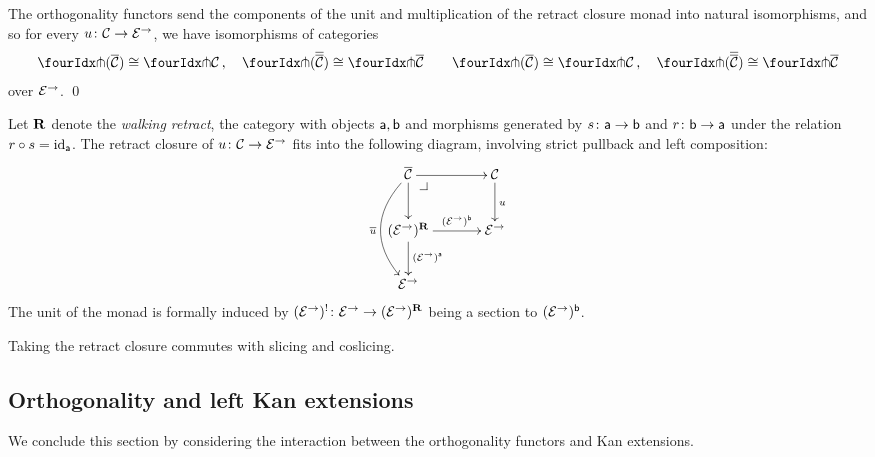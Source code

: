 \documentclass[reqno,10pt,a4paper,oneside]{amsart}
\begin{document}
\begin{proposition}
\label{retract-closure}
The orthogonality functors send the components of the unit and multiplication of the retract closure monad into natural
isomorphisms, and so for every $u \colon \mathcal{C} \to \mathcal{E}^\to$, we have isomorphisms of categories
\begin{gather*} 
 \liftr{(\overline{\cal{C}})} \iso \liftr{\cal{C}} \, , \quad
 \liftr{(\overline{\overline{\cal{C}}})} \iso \liftr{\overline{\cal{C}}}  \qquad
 \liftl{(\overline{\cal{C}})} \iso \liftl{\cal{C}} \, , \quad
 \liftl{(\overline{\overline{\cal{C}}})} \iso \liftl{\overline{\cal{C}}}
\end{gather*} 
over $\mathcal{E}^\to$. \qed
\end{proposition}




\begin{remark} Let $\mathbf{R}$ denote the \emph{walking retract}, \ie the category with objects $\mathsf{a}, \mathsf{b}$ and morphisms generated by $s \colon \mathsf{a} \to \mathsf{b}$ and $r \colon \mathsf{b} \to \mathsf{a}$ under the relation $r \mathbin{\circ} s = \operatorname{id}_{\mathsf{a}}$. The retract closure of $u \colon \mathcal{C} \to \mathcal{E}^\to$ fits into the following diagram, involving strict pullback and left composition:
\[
\xymatrix@C+1em{
  \overline{\cal{C}}
  \ar[r]
  \ar[d]
  \ar@/_2em/[dd]_{\overline{u}}
  \pullback{dr}
&
  \cal{C}
  \ar[d]^{u}
\\
  (\catE^{\to})^{\ret}
  \ar[r]^-{(\catE^{\to})^{\retB}}
  \ar[d]^{(\catE^{\to})^{\retA}}
&
  \catE^{\to}
\\
  \catE^{\to}
}
\]
The unit of the monad is formally induced by $(\mathcal{E}^{\to})^{\mathord{!}} \colon \mathcal{E}^{\to} \to (\mathcal{E}^{\to})^{\mathbf{R}}$ being a section to $(\mathcal{E}^{\to})^{\mathsf{b}}$.
\end{remark}


\begin{remark}
\label{retract-closure-slicing}
Taking the retract closure commutes with slicing and coslicing.
\end{remark}

\medskip

\subsection*{Orthogonality and left Kan extensions} 
We conclude this section by considering the interaction between the orthogonality functors and  Kan extensions.
\end{document}
